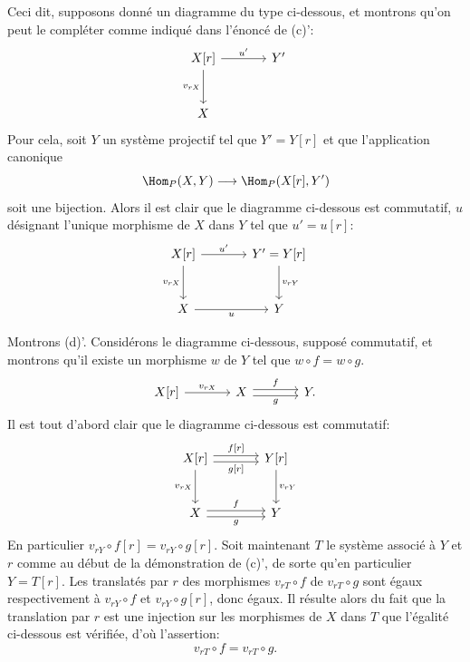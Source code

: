 Ceci dit, supposons donné un diagramme du type ci-dessous, et montrons qu'on peut le compléter comme indiqué dans l'énoncé de (c)':
\[
\begin{tikzcd}[column sep=large,row sep=large]
X[r] \arrow[r,"u'"] \arrow[d,"{v_{rX}}"'] & Y'\\
X
\end{tikzcd}
\]
Pour cela, soit $Y$ un système projectif tel que $Y'=Y[r]$ et que l'application canonique
\[
\Hom_P(X,Y)\longrightarrow\Hom_P(X[r],Y')
\]
soit une bijection. Alors il est clair que le diagramme ci-dessous est commutatif, $u$ désignant l'unique morphisme de $X$ dans $Y$ tel que $u'=u[r]$:
\[
\begin{tikzcd}[column sep=large,row sep=large]
X[r] \arrow[r,"u'"] \arrow[d,"{v_{rX}}"'] & Y'=Y[r] \arrow[d,"{v_{rY}}"]\\
X \arrow[r,"u"'] & Y
\end{tikzcd}
\]

Montrons (d)'. Considérons le diagramme ci-dessous, supposé commutatif, et montrons qu'il existe un morphisme $w$ de $Y$ tel que $w\circ f=w\circ g$.
\[
\begin{tikzcd}[column sep=large]
X[r] \arrow[r,"{v_{rX}}"] & X \arrow[r,shift left,"f"] \arrow[r,shift right,"g"'] & Y .
\end{tikzcd}
\]
Il est tout d'abord clair que le diagramme ci-dessous est commutatif:
\[
\begin{tikzcd}[column sep=large,row sep=large]
X[r] \arrow[r,shift left,"{f[r]}"] \arrow[r,shift right,"{g[r]}"'] \arrow[d,"{v_{rX}}"'] & Y[r] \arrow[d,"{v_{rY}}"]\\
X \arrow[r,shift left,"f"] \arrow[r,shift right,"g"'] & Y
\end{tikzcd}
\]
En particulier $v_{rY}\circ f[r]=v_{rY}\circ g[r]$. Soit maintenant $T$ le système associé à $Y$ et $r$ comme au début de la démonstration de (c)', de sorte qu'en
particulier $Y=T[r]$. Les translatés par $r$ des morphismes $v_{rT}\circ f$ de $v_{rT}\circ g$ sont égaux respectivement à $v_{rY}\circ f$ et $v_{rY}\circ g[r]$, donc égaux. Il résulte alors du fait que la translation par $r$ est une injection sur les morphismes de $X$ dans $T$ que l'égalité ci-dessous est vérifiée, d'où l'assertion:
\[
v_{rT}\circ f=v_{rT}\circ g.
\]

